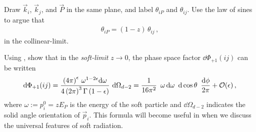 \begin{exercise}
    \label{ex:collinear-limit-angle}
    Draw \(\Vec{k}_i\), \(\Vec{k}_{j}\), and \(\Vec{P}\) in the same plane, and label \(\theta_{iP}\) and \(\theta_{ij}\).
    Use the law of sines to argue that
    \begin{align}
        \theta_{iP} = (1-z)\,\theta_{ij}
        \,,
    \end{align}
    in the \gls{collinear-limit}.
\end{exercise}



\begin{exercise}
    \label{ex:collinear-phase-space-energy}
    Using , show that in the \textit{\gls{soft-limit}} \(z \to 0\), the phase space factor \(\dd \Phi_{+1}(ij)\) can be written
    \begin{align}
        \dd \Phi_{+1}(ij)
        =
        \frac{
            \left(4 \pi\right)^\epsilon
            \,
            \omega^{1-2\epsilon} \dd \omega
            }{4 \left(2\pi\right)^3 \Gamma\left(1-\epsilon\right)}
        \,\,
        \dd \Omega_{d-2}
        =
        \frac{1}{16\pi^2}
        \,\,\,
        \omega\,\dd \omega
        \,\,\,
        \dd\cos\theta
        \,\,\,
        \frac{\dd\phi}{2\pi}
        +
        \mathcal{O}(\epsilon)
        \,,
    \end{align}
    where \(\omega := p_i^0 = z E_P\) is the energy of the soft particle and \(\dd\Omega_{d-2}\) indicates the solid angle orientation of \(\vec{p}_i\).
    This formula will become useful in  when we discuss the universal features of soft radiation.
\end{exercise}



